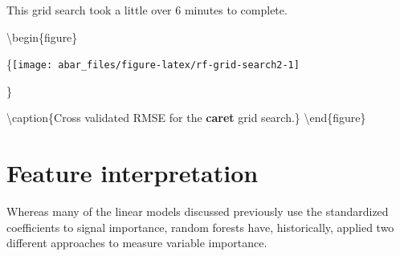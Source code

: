 \documentclass[]{book}
\newenvironment{Shaded}{\begin{snugshade}}{\end{snugshade}}
\newcommand{\CommentTok}[1]{\textcolor[rgb]{0.56,0.35,0.01}{\textit{#1}}}
\newcommand{\DataTypeTok}[1]{\textcolor[rgb]{0.13,0.29,0.53}{#1}}
\newcommand{\DecValTok}[1]{\textcolor[rgb]{0.00,0.00,0.81}{#1}}
\newcommand{\KeywordTok}[1]{\textcolor[rgb]{0.13,0.29,0.53}{\textbf{#1}}}
\newcommand{\NormalTok}[1]{#1}
\newcommand{\OperatorTok}[1]{\textcolor[rgb]{0.81,0.36,0.00}{\textbf{#1}}}
\newcommand{\StringTok}[1]{\textcolor[rgb]{0.31,0.60,0.02}{#1}}
\theoremstyle{definition}
\theoremstyle{definition}
\theoremstyle{definition}
\theoremstyle{remark}
\begin{document}
\begin{warning}
This grid search took a little over 6 minutes to complete.
\end{warning}

\begin{Shaded}
\end{Shaded}

\textbackslash{}begin\{figure\}

\{\centering \texttt{[image: abar\_files/figure-latex/rf-grid-search2-1]}

\}

\textbackslash{}caption\{Cross validated RMSE for the \textbf{caret}
grid search.\}\label{fig:rf-grid-search2} \textbackslash{}end\{figure\}

\hypertarget{feature-interpretation-2}{%
\section{Feature interpretation}\label{feature-interpretation-2}}

Whereas many of the linear models discussed previously use the
standardized coefficients to signal importance, random forests have,
historically, applied two different approaches to measure variable
importance.
\end{document}

